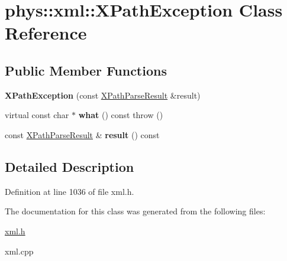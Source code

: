 \hypertarget{classphys_1_1xml_1_1XPathException}{
\section{phys::xml::XPathException Class Reference}
\label{d4/d30/classphys_1_1xml_1_1XPathException}
}
\subsection*{Public Member Functions}
\begin{DoxyCompactItemize}
\item 
\hypertarget{classphys_1_1xml_1_1XPathException_a2c326bac98d78d0816310bfac6c3b68f}{
{\bfseries XPathException} (const \hyperlink{structphys_1_1xml_1_1XPathParseResult}{XPathParseResult} \&result)}
\label{d4/d30/classphys_1_1xml_1_1XPathException_a2c326bac98d78d0816310bfac6c3b68f}

\item 
\hypertarget{classphys_1_1xml_1_1XPathException_a36e9d9daa5c8e2680057b2e1642ed225}{
virtual const char $\ast$ {\bfseries what} () const   throw ()}
\label{d4/d30/classphys_1_1xml_1_1XPathException_a36e9d9daa5c8e2680057b2e1642ed225}

\item 
\hypertarget{classphys_1_1xml_1_1XPathException_a37af29b6a83c06c8f2bf89eace7704fd}{
const \hyperlink{structphys_1_1xml_1_1XPathParseResult}{XPathParseResult} \& {\bfseries result} () const }
\label{d4/d30/classphys_1_1xml_1_1XPathException_a37af29b6a83c06c8f2bf89eace7704fd}

\end{DoxyCompactItemize}


\subsection{Detailed Description}


Definition at line 1036 of file xml.h.



The documentation for this class was generated from the following files:\begin{DoxyCompactItemize}
\item 
\hyperlink{xml_8h}{xml.h}\item 
xml.cpp\end{DoxyCompactItemize}
